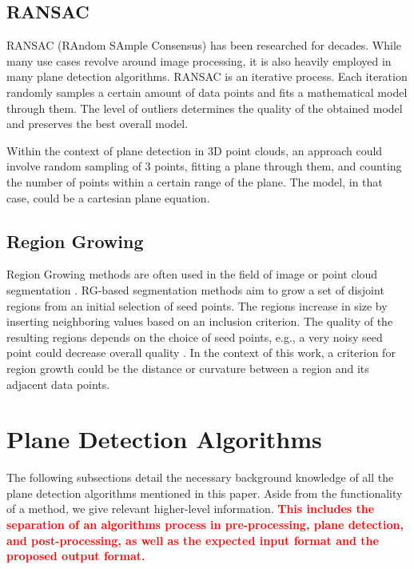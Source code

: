 \documentclass[main.tex]{subfiles}
\begin{document}
\subsection*{RANSAC}
RANSAC (RAndom SAmple Consensus) has been researched for decades. While many use cases revolve around image processing, it is also heavily employed in many plane detection algorithms\cite{Sun_Mordohai_2019, Yang_Forstner, Ashraf_Ahmed_2017}.
RANSAC is an iterative process. Each iteration randomly samples a certain amount of data points and fits a mathematical model through them. The level of outliers determines the quality of the obtained model and preserves the best overall model.

Within the context of plane detection in 3D point clouds, an approach could involve random sampling of 3 points, fitting a plane through them,
and counting the number of points within a certain range of the plane\cite{Yang_Forstner}. The model, in that case, could be a cartesian plane equation.

\subsection*{Region Growing}
Region Growing methods are often used in the field of image or point cloud segmentation \cite{Proença_Gao_2018, Vo_Truong-Hong_Laefer_Bertolotto_2015}.
RG-based segmentation methods aim to grow a set of disjoint regions from an initial selection of seed points. The regions increase in size by inserting neighboring values based on an inclusion criterion.
The quality of the resulting regions depends on the choice of seed points, e.g., a very noisy seed point could decrease overall quality  \cite{Malek_Rahman_Yasiran_Jumaat_Jalil_2012}.
In the context of this work, a criterion for region growth could be the distance or curvature between a region and its adjacent data points.

\section{Plane Detection Algorithms}
The following subsections detail the necessary background knowledge of all the plane detection algorithms mentioned in this paper.
Aside from the functionality of a method, we give relevant higher-level information. \textbf{\textcolor{red}{This includes the separation of an algorithms
process in pre-processing, plane detection, and post-processing, as well as the expected input format and the proposed output format.}}
\end{document}
